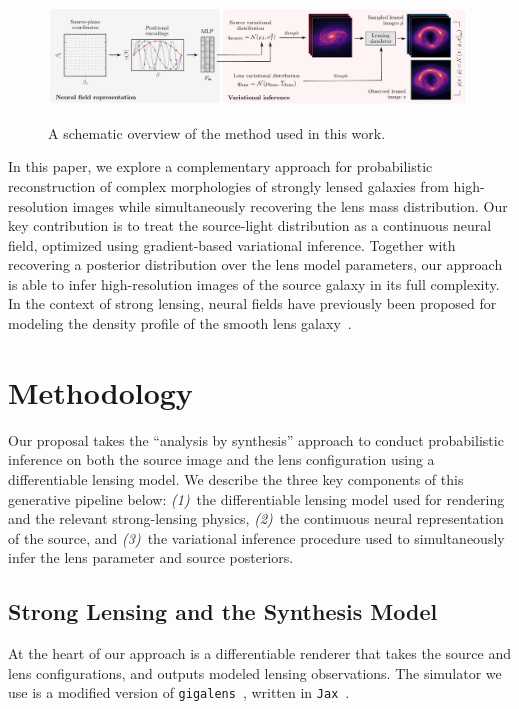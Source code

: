 \documentclass[nohyperref]{article}
\theoremstyle{plain}
\theoremstyle{definition}
\theoremstyle{remark}
\begin{document}
\begin{figure}[!t]
\centering
\includegraphics[width=0.99\textwidth]{figures/figure.pdf} \\
\caption{A schematic overview of the method used in this work.}\label{fig:figure}
\end{figure}

In this paper, we explore a complementary approach for probabilistic reconstruction of complex morphologies of strongly lensed galaxies from high-resolution images while simultaneously recovering the lens mass distribution. Our key contribution is to treat the source-light distribution as a continuous neural field, optimized using gradient-based variational inference. Together with recovering a posterior distribution over the lens model parameters, our approach is able to infer high-resolution images of the source galaxy in its full complexity. In the context of strong lensing, neural fields have previously been proposed for modeling the density profile of the smooth lens galaxy~\cite{biggio2021ml4ps}.

\section{Methodology}
\label{sec:method}

Our proposal takes the ``analysis by synthesis'' approach to conduct probabilistic inference on both the source image and the lens configuration using a differentiable lensing model. We describe the three key components of this generative pipeline below: \emph{(1)}~the differentiable lensing model used for rendering and the relevant strong-lensing physics, \emph{(2)}~the continuous neural representation of the source, and \emph{(3)}~the variational inference procedure used to simultaneously infer the lens parameter and source posteriors.


\subsection{Strong Lensing and the Synthesis Model}

At the heart of our approach is a differentiable renderer that takes the source and lens configurations, and outputs modeled lensing observations. The simulator we use is a modified version of \texttt{gigalens}~\cite{gu2022giga}, written in \texttt{Jax}~\cite{jax2018github}. 
\end{document}
